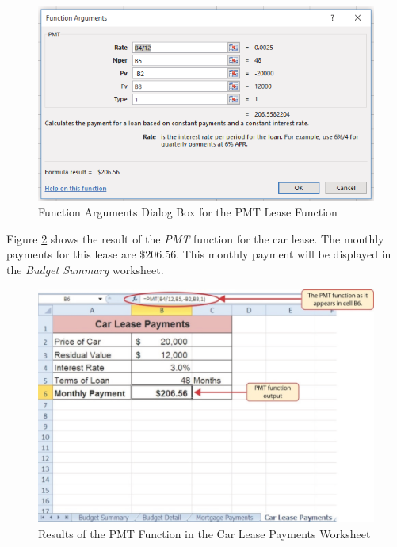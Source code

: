 \begin{figure}[H]
	\centering
	\includegraphics[width=\maxwidth{.95\linewidth}]{gfx/ch02_fig34}
	\caption{Function Arguments Dialog Box for the PMT Lease Function}
	\label{02:fig34}
\end{figure}

Figure \ref{02:fig35} shows the result of the \textit{PMT} function for the car lease. The monthly payments for this lease are $ \$206.56 $. This monthly payment will be displayed in the \textit{Budget Summary} worksheet.

\begin{figure}[H]
	\centering
	\includegraphics[width=\maxwidth{.95\linewidth}]{gfx/ch02_fig35}
	\caption{Results of the PMT Function in the Car Lease Payments Worksheet}
	\label{02:fig35}
\end{figure}

